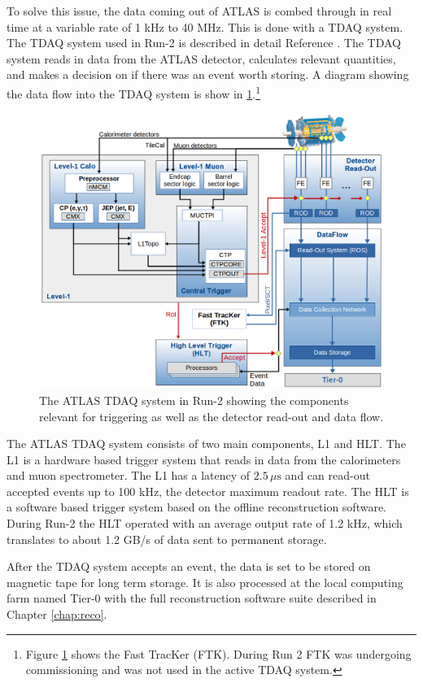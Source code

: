 		To solve this issue, the data coming out of \gls{ATLAS} is combed through in real time at a variable rate of 1 kHz to 40 MHz. This is done with a \gls{TDAQ} system. The \gls{TDAQ} system used in Run-2 is described in detail Reference \cite{ATLAS-trigger-Run2}. The \gls{TDAQ} system reads in data from the \gls{ATLAS} detector, calculates relevant quantities, and makes a decision on if there was an event worth storing. A diagram showing the data flow into the \gls{TDAQ} system is show in \ref{fig:trigger-run2}.\footnote{Figure \ref{fig:trigger-run2} shows the Fast TracKer (FTK). During Run 2 FTK was undergoing commissioning and was not used in the active \gls{TDAQ} system.} 
		\begin{figure}[!ht]
		\centering
		\includegraphics[width=\textwidth,keepaspectratio=true]{chapters/chapter3_experiment/images/tdaq-run2-schematic2017.png}
		\caption{The \gls{ATLAS} \gls{TDAQ} system in Run-2 showing the components relevant for triggering as well as the detector read-out and data flow. \cite{TDAQ_Diagram}}
		\label{fig:trigger-run2}
		\end{figure}
		The \gls{ATLAS} \gls{TDAQ} system consists of two main components, \gls{L1} and \gls{HLT}. The \gls{L1} is a hardware based trigger system that reads in data from the calorimeters and muon spectrometer. The \gls{L1} has a latency of $2.5 \, \mu \mathrm{s}$ and can read-out accepted events up to 100 kHz, the detector maximum readout rate. The \gls{HLT} is a software based trigger system based on the offline reconstruction software. During Run-2 the \gls{HLT} operated with an average output rate of 1.2 kHz, which translates to about 1.2 GB/s of data sent to permanent storage.	

		After the \gls{TDAQ} system accepts an event, the data is set to be stored on magnetic tape for long term storage. It is also processed at the local computing farm named Tier-0 with the full reconstruction software suite described in Chapter \ref{chap:reco}.


